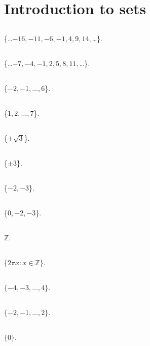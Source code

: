 \section{Introduction to sets}
   \subsection{} \{\ldots $-16,-11,-6,-1,4,9,14,$\ldots \}.
   \subsection{} \{\ldots $-7,-4,-1,2,5,8,11,$\ldots \}.
   \subsection{} \{$-2,-1,\ldots,6$\}.
   \subsection{} \{$1,2,\ldots,7$\}.
   \subsection{} \{$\pm\sqrt{3}$\}.
   \subsection{} \{$\pm 3$\}.
   \subsection{} \{$-2,-3$\}.
   \subsection{} \{$0,-2,-3$\}.
   \subsection{} $\mathbb{Z}$.
   \subsection{} \{$2\pi x : x \in \mathbb{Z}$\}.
   \subsection{} $\{-4,-3,\ldots,4\}$.
   \subsection{} $\{-2,-1,\ldots,2\}$.
   \subsection{} $\{0\}$.

